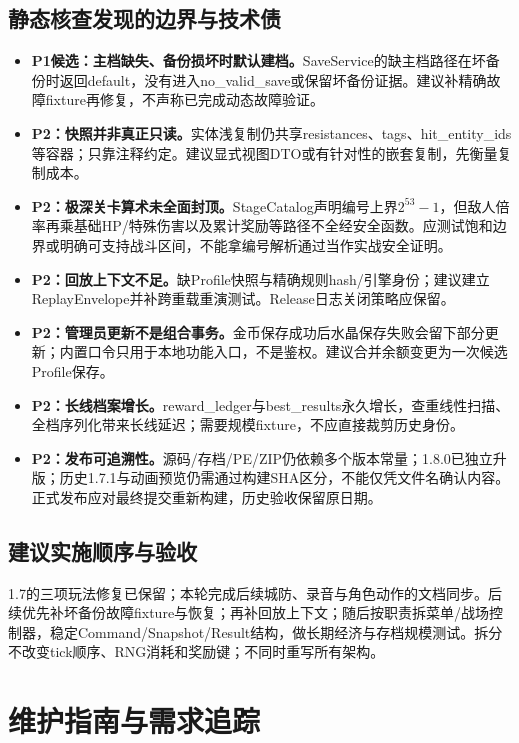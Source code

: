 \documentclass[UTF8,a4paper,11pt,fontset=windows]{ctexart}
\newcommand{\nextsection}[1]{\par\bigskip\section{#1}}
\begin{document}
\subsection{静态核查发现的边界与技术债}
\begin{itemize}
\item \textbf{P1候选：主档缺失、备份损坏时默认建档。}SaveService的缺主档路径在坏备份时返回default，没有进入no\_valid\_save或保留坏备份证据。建议补精确故障fixture再修复，不声称已完成动态故障验证。
\item \textbf{P2：快照并非真正只读。}实体浅复制仍共享resistances、tags、hit\_entity\_ids等容器；只靠注释约定。建议显式视图DTO或有针对性的嵌套复制，先衡量复制成本。
\item \textbf{P2：极深关卡算术未全面封顶。}StageCatalog声明编号上界$2^{53}-1$，但敌人倍率再乘基础HP/特殊伤害以及累计奖励等路径不全经安全函数。应测试饱和边界或明确可支持战斗区间，不能拿编号解析通过当作实战安全证明。
\item \textbf{P2：回放上下文不足。}缺Profile快照与精确规则hash/引擎身份；建议建立ReplayEnvelope并补跨重载重演测试。Release日志关闭策略应保留。
\item \textbf{P2：管理员更新不是组合事务。}金币保存成功后水晶保存失败会留下部分更新；内置口令只用于本地功能入口，不是鉴权。建议合并余额变更为一次候选Profile保存。
\item \textbf{P2：长线档案增长。}reward\_ledger与best\_results永久增长，查重线性扫描、全档序列化带来长线延迟；需要规模fixture，不应直接裁剪历史身份。
\item \textbf{P2：发布可追溯性。}源码/存档/PE/ZIP仍依赖多个版本常量；1.8.0已独立升版；历史1.7.1与动画预览仍需通过构建SHA区分，不能仅凭文件名确认内容。正式发布应对最终提交重新构建，历史验收保留原日期。
\end{itemize}

\subsection{建议实施顺序与验收}
1.7的三项玩法修复已保留；本轮完成后续城防、录音与角色动作的文档同步。后续优先补坏备份故障fixture与恢复；再补回放上下文；随后按职责拆菜单/战场控制器，稳定Command/Snapshot/Result结构，做长期经济与存档规模测试。拆分不改变tick顺序、RNG消耗和奖励键；不同时重写所有架构。

\nextsection{维护指南与需求追踪}
\end{document}
